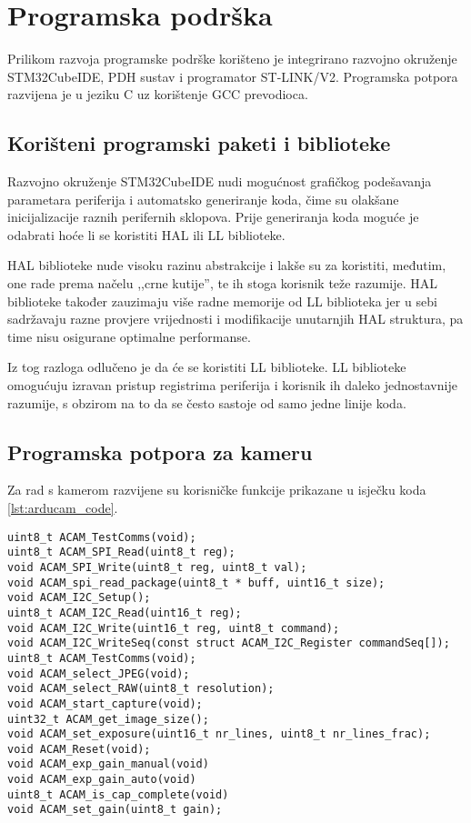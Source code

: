 \chapter{Programska podrška}

Prilikom razvoja programske podrške korišteno je integrirano razvojno okruženje \\ STM32CubeIDE, PDH sustav i programator ST-LINK/V2. Programska potpora razvijena je u jeziku C uz korištenje GCC prevodioca.

\section{Korišteni programski paketi i biblioteke}

Razvojno okruženje STM32CubeIDE nudi mogućnost grafičkog podešavanja parametara periferija i automatsko generiranje koda, čime su olakšane inicijalizacije raznih perifernih sklopova. Prije generiranja koda moguće je odabrati hoće li se koristiti HAL  ili LL  biblioteke.

HAL biblioteke nude visoku razinu abstrakcije i lakše su za koristiti, međutim, one rade prema načelu ,,crne kutije'', te ih stoga korisnik teže razumije. HAL biblioteke također zauzimaju više radne memorije od LL biblioteka jer u sebi sadržavaju razne provjere vrijednosti i modifikacije unutarnjih HAL struktura, pa time nisu osigurane optimalne performanse.

Iz tog razloga odlučeno je da će se koristiti LL biblioteke. LL biblioteke omogućuju izravan pristup registrima periferija i korisnik ih daleko jednostavnije razumije, s obzirom na to da se često sastoje od samo jedne linije koda.

\section{Programska potpora za kameru}

Za rad s kamerom razvijene su korisničke funkcije prikazane u isječku koda \ref{lst:arducam_code}.

\begin{minipage}{\linewidth}
\begin{lstlisting}[caption=Korisničke funkcije za Arducam 5MP Mini Plus, label={lst:arducam_code}]
uint8_t ACAM_TestComms(void);
uint8_t ACAM_SPI_Read(uint8_t reg);
void ACAM_SPI_Write(uint8_t reg, uint8_t val);
void ACAM_spi_read_package(uint8_t * buff, uint16_t size);
void ACAM_I2C_Setup();
uint8_t ACAM_I2C_Read(uint16_t reg);
void ACAM_I2C_Write(uint16_t reg, uint8_t command);
void ACAM_I2C_WriteSeq(const struct ACAM_I2C_Register commandSeq[]);
uint8_t ACAM_TestComms(void);
void ACAM_select_JPEG(void);
void ACAM_select_RAW(uint8_t resolution);
void ACAM_start_capture(void);
uint32_t ACAM_get_image_size();
void ACAM_set_exposure(uint16_t nr_lines, uint8_t nr_lines_frac);
void ACAM_Reset(void);
void ACAM_exp_gain_manual(void)
void ACAM_exp_gain_auto(void)
uint8_t ACAM_is_cap_complete(void)
void ACAM_set_gain(uint8_t gain);
\end{lstlisting}
\end{minipage}

